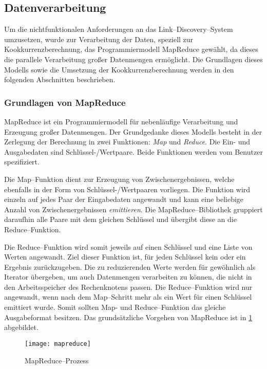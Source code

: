 \clearpage

\subsection{Datenverarbeitung}
\label{mapreduce}

Um die nichtfunktionalen Anforderungen an das Link--Discovery--System umzusetzen, wurde zur Verarbeitung der Daten, speziell zur Kookkurrenzberechnung, das Programmiermodell MapReduce gewählt, da dieses die parallele Verarbeitung großer Datenmengen ermöglicht. Die Grundlagen dieses Modells sowie die Umsetzung der Kookkurrenzberechnung werden in den folgenden Abschnitten beschrieben.

\subsubsection{Grundlagen von MapReduce}
\label{mapreduce_basic}

MapReduce \cite{dg2004} ist ein Programmiermodell für nebenläufige Verarbeitung und Erzeugung großer Datenmengen. Der Grundgedanke dieses Modells besteht in der Zerlegung der Berechnung in zwei Funktionen: \emph{Map} und \emph{Reduce}. Die Ein- und Ausgabedaten sind Schlüssel-/Wertpaare. Beide Funktionen werden vom Benutzer spezifiziert.

Die Map--Funktion dient zur Erzeugung von Zwischenergebnissen, welche ebenfalls in der Form von Schlüssel-/Wertpaaren vorliegen. Die Funktion wird einzeln auf jedes Paar der Eingabedaten angewandt und kann eine beliebige Anzahl von Zwischenergebnissen \emph{emittieren}. Die MapReduce--Bibliothek gruppiert daraufhin alle Paare mit dem gleichen Schlüssel und übergibt diese an die Reduce--Funktion.

Die Reduce--Funktion wird somit jeweils auf einen Schlüssel und eine Liste von Werten angewandt. Ziel dieser Funktion ist, für jeden Schlüssel kein oder ein Ergebnis zurückzugeben. Die zu reduzierenden Werte werden für gewöhnlich als Iterator übergeben, um auch Datenmengen verarbeiten zu können, die nicht in den Arbeitsspeicher des Rechenknotens passen. Die Reduce--Funktion wird nur angewandt, wenn nach dem Map--Schritt mehr als ein Wert für einen Schlüssel emittiert wurde. Somit sollten Map- und Reduce--Funktion das gleiche Ausgabeformat besitzen. Das grundsätzliche Vorgehen von MapReduce ist in \cref{fig:mapreduce} abgebildet.

\begin{figure}
\centering
\texttt{[image: mapreduce]}
\caption{MapReduce--Prozess}
\label{fig:mapreduce}
\end{figure}

